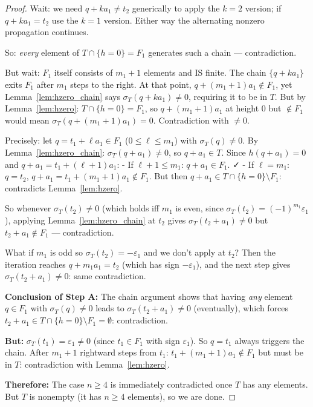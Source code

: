 \begin{proof}
Wait: we need $q+ka_1 \neq t_2$ generically to apply the $k=2$ version; if $q+ka_1=t_2$
use the $k=1$ version.  Either way the alternating nonzero propagation continues.

So: \emph{every} element of $T \cap \{h=0\} = F_1$ generates such a chain — contradiction.

But wait: $F_1$ itself consists of $m_1+1$ elements and IS finite.  The chain $\{q+ka_1\}$
exits $F_1$ after $m_1$ steps to the right.  At that point, $q+(m_1+1)a_1 \notin F_1$,
yet Lemma~\ref{lem:hzero_chain} says $\sigma_T(q+ka_1) \neq 0$, requiring it to be in $T$.
But by Lemma~\ref{lem:hzero}: $T \cap \{h=0\} = F_1$, so $q+(m_1+1)a_1$ at height $0$
but $\notin F_1$ would mean $\sigma_T(q+(m_1+1)a_1)=0$.  Contradiction with $\neq 0$.

Precisely: let $q = t_1 + \ell a_1 \in F_1$ ($0 \leq \ell \leq m_1$) with $\sigma_T(q) \neq 0$.
By Lemma~\ref{lem:hzero_chain}: $\sigma_T(q+a_1) \neq 0$, so $q+a_1 \in T$.
Since $h(q+a_1)=0$ and $q+a_1 = t_1+(\ell+1)a_1$:
  - If $\ell+1 \leq m_1$: $q+a_1 \in F_1$. ✓
  - If $\ell = m_1$: $q = t_2$, $q+a_1 = t_1+(m_1+1)a_1 \notin F_1$.
    But then $q+a_1 \in T \cap \{h=0\} \setminus F_1$: contradicts Lemma~\ref{lem:hzero}.

So whenever $\sigma_T(t_2) \neq 0$ (which holds iff $m_1$ is even, since $\sigma_T(t_2) = (-1)^{m_1}\varepsilon_1$),
applying Lemma~\ref{lem:hzero_chain} at $t_2$ gives $\sigma_T(t_2+a_1) \neq 0$
but $t_2+a_1 \notin F_1$ — contradiction.

What if $m_1$ is odd so $\sigma_T(t_2) = -\varepsilon_1$ and we don't apply at $t_2$?
Then the iteration reaches $q+m_1a_1 = t_2$ (which has sign $-\varepsilon_1$), and the
next step gives $\sigma_T(t_2+a_1)\neq 0$: same contradiction.

\textbf{Conclusion of Step A:} The chain argument shows that having \emph{any} element
$q \in F_1$ with $\sigma_T(q)\neq 0$ leads to $\sigma_T(t_2+a_1)\neq 0$ (eventually),
which forces $t_2+a_1 \in T\cap\{h=0\}\setminus F_1 = \emptyset$: contradiction.

\textbf{But:} $\sigma_T(t_1) = \varepsilon_1 \neq 0$ (since $t_1 \in F_1$ with sign $\varepsilon_1$).
So $q=t_1$ always triggers the chain.  After $m_1+1$ rightward steps from $t_1$:
$t_1+(m_1+1)a_1 \notin F_1$ but must be in $T$: contradiction with Lemma~\ref{lem:hzero}.

\textbf{Therefore:} The case $n \geq 4$ is immediately contradicted once $T$ has any elements.
But $T$ is nonempty (it has $n \geq 4$ elements), so we are done. \checkmark


\end{proof}
